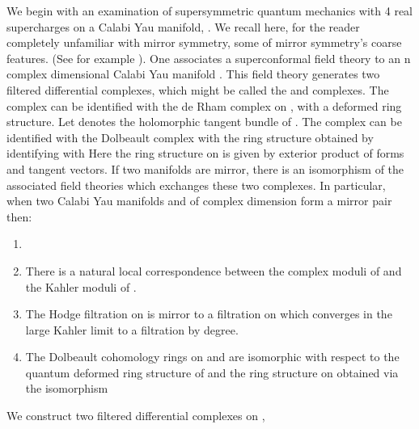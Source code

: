 \documentclass[a4paper,11pt]{amsart}
\begin{document}
 
We begin with an examination of supersymmetric quantum mechanics with 4 real
 supercharges 
on a Calabi Yau manifold, \coordHE{}. 
We recall here, for the reader completely unfamiliar with mirror symmetry, some of
 mirror symmetry's coarse features. (See for example \cite{CK}).  
One associates a superconformal field theory to an n complex dimensional 
Calabi Yau manifold \coordHE{}. This
field theory generates two filtered 
differential complexes, which might be called the \coordHE{} and \coordHE{} complexes. The
\coordHE{} 
complex can be identified with the de Rham complex on \coordHE{}, with a deformed ring
 structure. Let \coordHE{} denotes the holomorphic tangent bundle of \coordHE{}. The 
 \coordHE{} 
 complex can be identified with the Dolbeault complex with the ring structure
  obtained by identifying \coordHE{} with \coordHE{} Here 
  the ring structure on \coordHE{} is
given by exterior product of forms and tangent vectors. 
If two manifolds are mirror, there is an isomorphism of the associated field
theories which exchanges these two complexes. In particular, when two 
Calabi Yau manifolds \coordHE{} and \coordHE{} of complex dimension \coordHE{} form a mirror pair
 then: 
\begin{enumerate}
\item {}\coordHE{}
\item  There is a natural local correspondence between the complex moduli of \coordHE{}
and the Kahler moduli of \coordHE{}.
\item The Hodge filtration on \coordHE{} is mirror to a filtration on \coordHE{} which
converges in the large Kahler limit to a filtration by degree. 
\item The Dolbeault cohomology rings on \coordHE{} and \coordHE{} are isomorphic with 
respect to the quantum deformed ring structure of
\coordHE{} and the ring structure on \coordHE{} obtained via the
isomorphism \coordHE{}
\end{enumerate} 
We construct two filtered differential complexes on \coordHE{},
\end{document}
